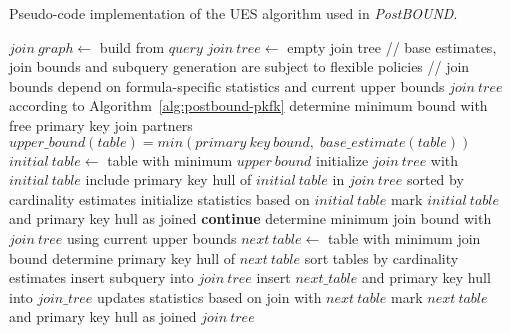 \begin{algorithm}
    \caption{Pseudo-code implementation of the UES algorithm used in \emph{PostBOUND}.}
    \label{alg:postbound}
    \begin{algorithmic}[1]
        \State $join\:graph \gets $ build from $query$
        \State $join\:tree \gets $ empty join tree
        \State
        \State // base estimates, join bounds and subquery generation are subject to flexible policies
        \State // join bounds depend on formula-specific statistics and current upper bounds
        \State
            \State \Return $join\:tree$ according to Algorithm~\ref{alg:postbound-pkfk}
        \EndIf
        \State
                \State determine minimum bound with free primary key join partners
                \State $upper\_bound(table) = min(primary\:key\:bound,\;base\_estimate(table))$
            \EndFor
            \State
                \State $initial\:table \gets$ table with minimum $upper\:bound$
                \State initialize $join\:tree$ with $initial\:table$
                \State include primary key hull of $initial\:table$ in $join\:tree$  \Comment sorted by cardinality estimates
                \State
                \State initialize statistics based on $initial\:table$
                \State mark $initial\:table$ and primary key hull as joined
                \State \textbf{continue}
            \EndIf
            \State
                \State determine minimum join bound with $join\:tree$ \Comment using current upper bounds
            \EndFor
            \State
            \State $next\:table \gets$ table with minimum join bound
            \State determine primary key hull of $next\:table$ \Comment sort tables by cardinality estimates
                \State insert subquery into $join\:tree$
            \Else
                \State insert $next\_table$ and primary key hull into $join\_tree$
            \EndIf
            \State
            \State updates statistics based on join with $next\:table$
            \State mark $next\:table$ and primary key hull as joined
        \EndWhile
        \State
        \State \Return $join\:tree$
    \end{algorithmic}
\end{algorithm}

